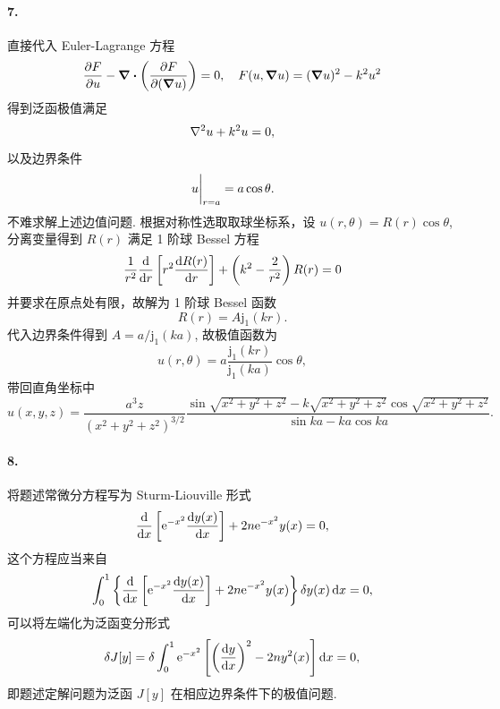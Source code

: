 \documentclass[12pt]{article}
\begin{document}
\paragraph{7.}
直接代入 Euler-Lagrange 方程
\begin{equation*}
	\pdv{F}{u} - \div(\pdv{F}{(\grad{u})}) = 0, \quad F(u, \grad{u}) = (\grad{u})^2 - k^2 u^2
\end{equation*}
得到泛函极值满足
\begin{equation*}
	\laplacian{u} + k^2 u = 0,
\end{equation*}
以及边界条件
\begin{equation*}
	\eval{u}_{r = a} = a\cos \theta.
\end{equation*}
不难求解上述边值问题.
根据对称性选取取球坐标系，设 $u(r, \theta) = R(r) \cos \theta$, 分离变量得到 $R(r)$ 满足 1 阶球 Bessel 方程
\begin{equation*}
	\frac{1}{r^2} \dv{r}\left[r^2 \dv{R(r)}{r}\right] + \left(k^2 - \frac{2}{r^2}\right) R(r) = 0
\end{equation*}
并要求在原点处有限，故解为 1 阶球 Bessel 函数
\begin{equation*}
	R(r) = A\mathrm{j}_1(kr).
\end{equation*}
代入边界条件得到 $A = a / \mathrm{j}_1(ka)$, 故极值函数为
\begin{equation*}
	u(r, \theta) = a\frac{\mathrm{j}_1(kr)}{\mathrm{j}_1(ka)} \cos \theta,
\end{equation*}
带回直角坐标中
\begin{equation*}
	u(x, y, z) = \frac{a^3 z}{(x^2 + y^2 + z^2)^{3/2}} \frac{\sin \sqrt{x^2 + y^2 + z^2} - k\sqrt{x^2 + y^2 + z^2} \cos\sqrt{x^2 + y^2 + z^2}}{\sin ka - ka \cos ka}.
\end{equation*}

\paragraph{8.}
将题述常微分方程写为 Sturm-Liouville 形式
\begin{equation*}
	\dv{x}\left[\mathrm{e}^{-x^2} \dv{y(x)}{x}\right] + 2n \mathrm{e}^{-x^2} y(x) = 0,
\end{equation*}
这个方程应当来自
\begin{equation*}
	\int_{0}^{1} \left\{\dv{x}\left[\mathrm{e}^{-x^2} \dv{y(x)}{x}\right] + 2n \mathrm{e}^{-x^2} y(x)\right\} \var{y(x)} \dd{x} = 0,
\end{equation*}
可以将左端化为泛函变分形式
\begin{equation*}
	\var{J[y]} = \var{\int_0^1 \mathrm{e}^{-x^2} \left[\left(\dv{y}{x}\right)^2 - 2n y^2(x)\right] \dd{x}} = 0,
\end{equation*}
即题述定解问题为泛函 $J[y]$ 在相应边界条件下的极值问题.
\end{document}
